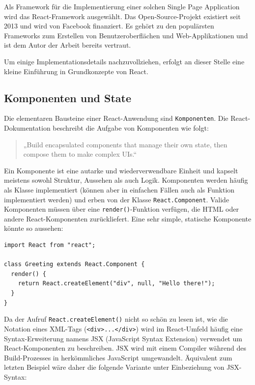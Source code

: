 Als Framework für die Implementierung einer solchen Single Page Application wird das React-Framework\cite{web:react} ausgewählt. Das Open-Source-Projekt existiert seit 2013 und wird von Facebook finanziert. Es gehört zu den populärsten Frameworks zum Erstellen von Benutzeroberflächen und Web-Applikationen und ist dem Autor der Arbeit bereits vertraut.

Um einige Implementationsdetails nachzuvollziehen, erfolgt an dieser Stelle eine kleine Einführung in Grundkonzepte von React.

\subsection{Komponenten und State}
Die elementaren Bausteine einer React-Anwendung sind \texttt{Komponenten}. Die React-Dokumentation beschreibt die Aufgabe von Komponenten wie folgt\cite{web:react}:
\begin{quotation}
„Build encapsulated components that manage their own state, then compose them to make complex UIs.“
\end{quotation}

Ein Komponente ist eine autarke und wiederverwendbare Einheit und kapselt meistens sowohl Struktur, Aussehen als auch Logik. Komponenten werden häufig als Klasse implementiert (können aber in einfachen Fällen auch als Funktion implementiert werden) und erben von der Klasse \texttt{React.Component}. Valide Komponenten müssen über eine \texttt{render()}-Funktion verfügen, die HTML oder andere React-Komponenten zurückliefert. Eine sehr simple, statische Komponente könnte so aussehen:

\begin{minipage}{\linewidth}
\begin{lstlisting}[caption={Einfache React-Komponente ohne JSX-Syntax.}]
import React from "react";

class Greeting extends React.Component {
  render() {
    return React.createElement("div", null, "Hello there!");
  }
}
\end{lstlisting}
\end{minipage}

Da der Aufruf \texttt{React.createElement()} nicht so schön zu lesen ist, wie die Notation eines XML-Tags (\texttt{<div>...</div>}) wird im React-Umfeld häufig eine Syntax-Erweiterung namens JSX (JavaScript Syntax Extension) verwendet um React-Komponenten zu beschreiben. JSX wird mit einem Compiler während des Build-Prozesses in herkömmliches JavaScript umgewandelt. Äquivalent zum letzten Beispiel wäre daher die folgende Variante unter Einbeziehung von JSX-Syntax:

